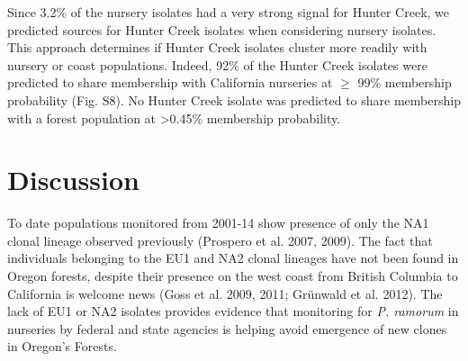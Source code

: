 \documentclass[double,12pt]{beavtex}
\begin{document}
  Since 3.2\% of the nursery isolates had a very strong signal for Hunter
  Creek, we predicted sources for Hunter Creek isolates when considering
  nursery isolates. This approach determines if Hunter Creek isolates
  cluster more readily with nursery or coast populations. Indeed, 92\% of
  the Hunter Creek isolates were predicted to share membership with
  California nurseries at \(\geq\) 99\% membership probability (Fig. S8).
  No Hunter Creek isolate was predicted to share membership with a forest
  population at \textgreater{}0.45\% membership probability.
  
  \section{Discussion}\label{discussion-1}
  
  To date populations monitored from 2001-14 show presence of only the NA1
  clonal lineage observed previously (Prospero et al. 2007, 2009). The
  fact that individuals belonging to the EU1 and NA2 clonal lineages have
  not been found in Oregon forests, despite their presence on the west
  coast from British Columbia to California is welcome news (Goss et al.
  2009, 2011; Grünwald et al. 2012). The lack of EU1 or NA2 isolates
  provides evidence that monitoring for \emph{P. ramorum} in nurseries by
  federal and state agencies is helping avoid emergence of new clones in
  Oregon's Forests.
  
\end{document}
